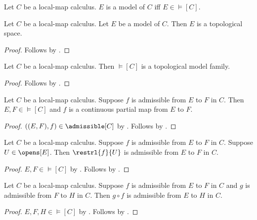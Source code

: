 \begin{definition}\label{calculus_model}
    Let $C$ be a local-map calculus.
    $E$ is a model of $C$ iff $E\in\models[C]$.
\end{definition}

\begin{classification}\label{calculus_model_topology}
    Let $C$ be a local-map calculus.
    Let $E$ be a model of $C$.
    Then $E$ is a topological space.
\end{classification}
\begin{proof}
    Follows by .
\end{proof}

\begin{classification}\label{calculus_models_are_topological_family}
    Let $C$ be a local-map calculus.
    Then $\models[C]$ is a topological model family.
\end{classification}
\begin{proof}
    Follows by .
\end{proof}

\begin{theorem}\label{admissible_map_sound}
    Let $C$ be a local-map calculus.
    Suppose $f$ is admissible from $E$ to $F$ in $C$.
    Then $E,F\in\models[C]$ and
        $f$ is a continuous partial map from $E$ to $F$.
\end{theorem}
\begin{proof}
    $((E,F),f)\in\admissible[C]$ by .
    Follows by .
\end{proof}

\begin{theorem}\label{admissible_map_restriction}
    Let $C$ be a local-map calculus.
    Suppose $f$ is admissible from $E$ to $F$ in $C$.
    Suppose $U\in\opens[E]$.
    Then $\restrl{f}{U}$ is admissible from $E$ to $F$ in $C$.
\end{theorem}
\begin{proof}
    $E,F\in\models[C]$ by .
    Follows by .
\end{proof}

\begin{theorem}\label{admissible_map_composition}
    Let $C$ be a local-map calculus.
    Suppose $f$ is admissible from $E$ to $F$ in $C$ and
        $g$ is admissible from $F$ to $H$ in $C$.
    Then $g\circ f$ is admissible from $E$ to $H$ in $C$.
\end{theorem}
\begin{proof}
    $E,F,H\in\models[C]$ by .
    Follows by .
\end{proof}

